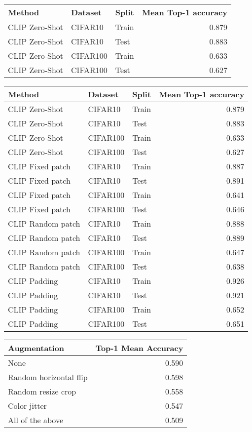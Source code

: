 \documentclass[11pt]{article}
\author{Marco A. Gallo}
\date{\today}
\title{}
\begin{document}
\tableofcontents

\begin{center}
\begin{tabular}{lllr}
Method & Dataset & Split & Mean Top-1 accuracy\\
\hline
CLIP Zero-Shot & CIFAR10 & Train & 0.879\\
CLIP Zero-Shot & CIFAR10 & Test & 0.883\\
CLIP Zero-Shot & CIFAR100 & Train & 0.633\\
CLIP Zero-Shot & CIFAR100 & Test & 0.627\\
\end{tabular}
\end{center}


\begin{center}
\begin{tabular}{lllr}
Method & Dataset & Split & Mean Top-1 accuracy\\
\hline
CLIP Zero-Shot & CIFAR10 & Train & 0.879\\
CLIP Zero-Shot & CIFAR10 & Test & 0.883\\
CLIP Zero-Shot & CIFAR100 & Train & 0.633\\
CLIP Zero-Shot & CIFAR100 & Test & 0.627\\
CLIP Fixed patch & CIFAR10 & Train & 0.887\\
CLIP Fixed patch & CIFAR10 & Test & 0.891\\
CLIP Fixed patch & CIFAR100 & Train & 0.641\\
CLIP Fixed patch & CIFAR100 & Test & 0.646\\
CLIP Random patch & CIFAR10 & Train & 0.888\\
CLIP Random patch & CIFAR10 & Test & 0.889\\
CLIP Random patch & CIFAR100 & Train & 0.647\\
CLIP Random patch & CIFAR100 & Test & 0.638\\
CLIP Padding & CIFAR10 & Train & 0.926\\
CLIP Padding & CIFAR10 & Test & 0.921\\
CLIP Padding & CIFAR100 & Train & 0.652\\
CLIP Padding & CIFAR100 & Test & 0.651\\
\end{tabular}
\end{center}


\begin{center}
\begin{tabular}{lr}
Augmentation & Top-1 Mean Accuracy\\
\hline
None & 0.590\\
Random horizontal flip & 0.598\\
Random resize crop & 0.558\\
Color jitter & 0.547\\
All of the above & 0.509\\
\end{tabular}
\end{center}
\end{document}

